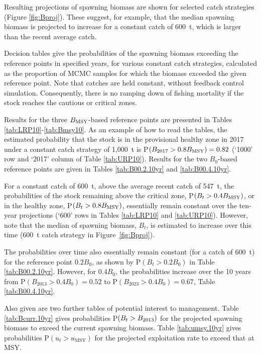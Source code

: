 Resulting projections of spawning biomass are shown for selected catch strategies (Figure \ref{fig:Bproj}). These suggest, for example, that the median spawning biomass is projected to increase for a constant catch of 600~t, which is larger than the recent average catch. 

Decision tables give the probabilities of the spawning biomass exceeding the reference points in specified years, for various constant catch strategies, calculated as the proportion of MCMC samples for which the biomass exceeded the given reference point. Note that catches are held constant, without feedback control simulation. Consequently, there is no ramping down of fishing mortality if the stock reaches the cautious or critical zones.

Results for the three $B_\mathrm{MSY}$-based reference points are presented in Tables \ref{tab:LRP10}-\ref{tab:Bmsy10}. As an example of how to read the tables, the estimated probability that the stock is in the provisional healthy zone in 2017 under a constant catch strategy of 1,000~t is P$(B_{2017} > 0.8 B_\mathrm{MSY})=0.82$ (`1000' row and `2017' column of Table \ref{tab:URP10}). Results for the two $B_0$-based reference points are given in Tables \ref{tab:B00.2.10yr} and \ref{tab:B00.4.10yr}. 

For a constant catch of 600~t, above the average recent catch of 547~t, the probabilities of the stock remaining above the critical zone, P$(B_{t} > 0.4 B_\mathrm{MSY})$, or in the healthy zone, P$(B_{t} > 0.8 B_\mathrm{MSY})$, essentially remain constant over the ten-year projections (`600' rows in Tables \ref{tab:LRP10} and \ref{tab:URP10}). However, note that the median of spawning biomass, $B_t$, is estimated to increase over this time (600~t catch strategy in Figure~\ref{fig:Bproj}).

The probabilities over time also essentially remain constant (for a catch of 600~t) for the reference point $0.2 B_0$, as shown by P$(B_{t} > 0.2 B_0)$ in Table \ref{tab:B00.2.10yr}. However, for $0.4 B_0$, the probabilities increase over the 10 years from P$(B_{2013} > 0.4 B_0)=0.52$ to P$(B_{2023} > 0.4 B_0)=0.67$, Table \ref{tab:B00.4.10yr}. 

Also given are two further tables of potential interest to management. Table \ref{tab:Bcurr.10yr} gives probabilities P$(B_t > B_{2013})$ for the projected spawning biomass to exceed the current spawning biomass. Table \ref{tab:umsy.10yr} gives probabilities P$(u_t > u_\mathrm{MSY})$ for the projected exploitation rate to exceed that at MSY.

